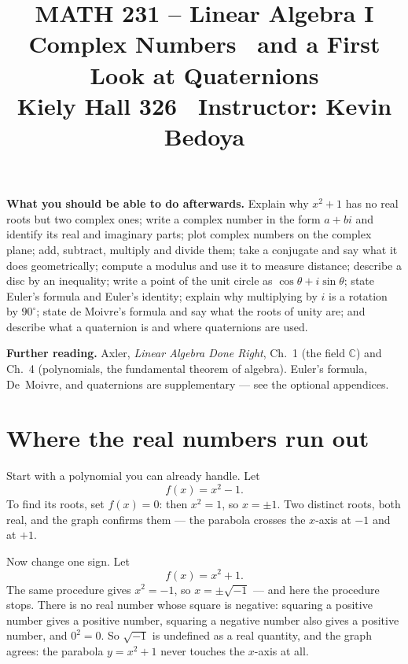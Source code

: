 \documentclass[11pt]{article}
\title{\vspace{-1.2cm}\textbf{\sffamily MATH 231 -- Linear Algebra I}\\[4pt]
       {\large\sffamily Complex Numbers \textbullet\ and a First Look at
        Quaternions}\\[2pt]
       {\normalsize\sffamily Kiely Hall 326 \textbullet\
        Instructor: Kevin Bedoya}}
\author{}
\date{}
\theoremstyle{definition}
\theoremstyle{remark}
\newcommand{\C}{\mathbb{C}}
\begin{document}
\maketitle
\vspace{-1.6cm}

\noindent\textbf{What you should be able to do afterwards.} Explain why
$x^{2}+1$ has no real roots but two complex ones; write a complex number in the
form $a+bi$ and identify its real and imaginary parts; plot complex numbers on
the complex plane; add, subtract, multiply and divide them; take a conjugate and
say what it does geometrically; compute a modulus and use it to measure
distance; describe a disc by an inequality; write a point of the unit circle as
$\cos\theta+i\sin\theta$; state Euler's formula and Euler's identity; explain
why multiplying by $i$ is a rotation by $90^{\circ}$; state de Moivre's formula
and say what the roots of unity are; and describe what a quaternion is and where
quaternions are used.

\medskip
\noindent\textbf{Further reading.}
Axler, \emph{Linear Algebra Done Right}, Ch.~1 (the field $\C$) and Ch.~4
(polynomials, the fundamental theorem of algebra). Euler's formula, De~Moivre,
and quaternions are supplementary --- see the optional appendices.

\section{Where the real numbers run out}
Start with a polynomial you can already handle. Let
\[
  f(x)=x^{2}-1 .
\]
To find its roots, set $f(x)=0$: then $x^{2}=1$, so $x=\pm 1$. Two distinct
roots, both real, and the graph confirms them --- the parabola crosses the
$x$-axis at $-1$ and at $+1$.

Now change one sign. Let
\[
  f(x)=x^{2}+1 .
\]
The same procedure gives $x^{2}=-1$, so $x=\pm\sqrt{-1}$ --- and here the
procedure stops. There is no real number whose square is negative: squaring a
positive number gives a positive number, squaring a negative number also gives a
positive number, and $0^{2}=0$. So $\sqrt{-1}$ is undefined as a real quantity,
and the graph agrees: the parabola $y=x^{2}+1$ never touches the $x$-axis at
all.
\end{document}

